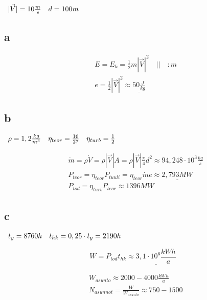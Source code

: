 \documentclass[12pt,a4paper,finnish]{article}
\begin{document}
\begin{math}
 \begin{array}{l l}
  |\vec{V}| = 10 \frac{m}{s} & d = 100m
 \end{array}
\end{math}

\subsection{a}
\begin{align}
 &E = E_k = \frac{1}{2}m|\vec{V}|^2 \quad \bigg|\bigg| \quad :m\\
 &e = \frac{1}{2}|\vec{V}|^2 \approx \underline{50 \frac{J}{kg}}
\end{align}

\subsection{b}
\begin{math}
 \begin{array}{l l l}
  \rho = 1,2 \frac{kg}{m^3} & \eta_{teor} = \frac{16}{27} & \eta_{turb} = \frac{1}{2}
 \end{array}
\end{math}

\begin{align}
 &\dot{m} = \rho \dot{V} = \rho|\vec{V}|A = \rho|\vec{V}|\frac{\pi}{4}d^2 \approx 94,248 \cdot 10^3 \frac{kg}{s}\\
 &P_{teor} = \eta_{teor}P_{tuuli} = \eta_{teor}\dot{m}e \approx \underline{2,793 MW}\\
 &P_{tod} = \eta_{turb}P_{teor} \approx 1396 MW
\end{align}

\subsection{c}
\begin{math}
 \begin{array}{l l}
  t_y = 8760h & t_{hk} = 0,25\cdot t_y = 2190h
 \end{array}
\end{math}

\begin{equation}
 W = P_{tod}t_{hk} \approx \underline{3,1\cdot 10^6 \frac{kWh}{a}}
\end{equation}

\begin{align}
 &W_{asunto} \approx 2000 - 4000 \frac{kWh}{a}\\
 &N_{asunnot} = \frac{W}{W_{asunto}} \approx 750 - 1500
\end{align}
\end{document}

